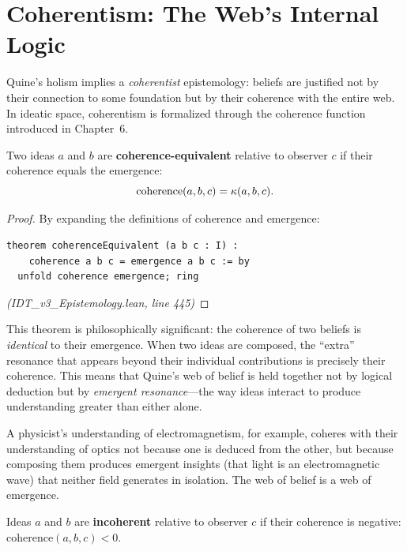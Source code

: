 \section{Coherentism: The Web's Internal Logic}

Quine's holism implies a \emph{coherentist} epistemology: beliefs are justified
not by their connection to some foundation but by their coherence with the
entire web. In ideatic space, coherentism is formalized through the coherence
function introduced in Chapter~6.

\begin{theorem}
\label{thm:coherence-equivalence}
Two ideas $a$ and $b$ are \textbf{coherence-equivalent} relative to observer $c$
if their coherence equals the emergence:
\[
  \mathrm{coherence}(a, b, c) = \kappa(a, b, c).
\]
\end{theorem}

\begin{proof}
By expanding the definitions of coherence and emergence:
\begin{lstlisting}
theorem coherenceEquivalent (a b c : I) :
    coherence a b c = emergence a b c := by
  unfold coherence emergence; ring
\end{lstlisting}
\textit{(IDT\_v3\_Epistemology.lean, line 445)}
\end{proof}

\begin{interpretation}
This theorem is philosophically significant: the coherence of two beliefs is
\emph{identical} to their emergence. When two ideas are composed, the ``extra''
resonance that appears beyond their individual contributions is precisely their
coherence. This means that Quine's web of belief is held together not by logical
deduction but by \emph{emergent resonance}---the way ideas interact to produce
understanding greater than either alone.

A physicist's understanding of electromagnetism, for example, coheres with their
understanding of optics not because one is deduced from the other, but because
composing them produces emergent insights (that light is an electromagnetic wave)
that neither field generates in isolation. The web of belief is a web of
emergence.
\end{interpretation}

\begin{definition}[Incoherence]
\label{def:incoherence}
Ideas $a$ and $b$ are \textbf{incoherent} relative to observer $c$ if their
coherence is negative: $\mathrm{coherence}(a, b, c) < 0$.
\end{definition}

